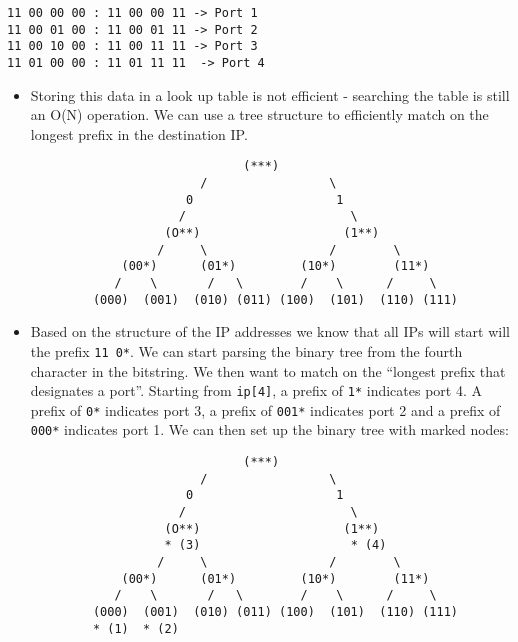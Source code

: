 \begin{itemize}
\begin{verbatim}
11 00 00 00 : 11 00 00 11 -> Port 1
11 00 01 00 : 11 00 01 11 -> Port 2
11 00 10 00 : 11 00 11 11 -> Port 3
11 01 00 00 : 11 01 11 11  -> Port 4
\end{verbatim}

  \begin{itemize}
  \tightlist
  \item
    Storing this data in a look up table is not efficient - searching
    the table is still an O(N) operation. We can use a tree structure to
    efficiently match on the longest prefix in the destination IP.
  \end{itemize}

\begin{verbatim}
                                 (***)
                           /                 \
                         0                    1
                        /                       \
                      (O**)                    (1**)
                     /     \                 /        \
                (00*)      (01*)         (10*)        (11*)
               /    \       /   \        /    \      /     \
            (000)  (001)  (010) (011) (100)  (101)  (110) (111)
\end{verbatim}

  \begin{itemize}
  \tightlist
  \item
    Based on the structure of the IP addresses we know that all IPs will
    start will the prefix \texttt{11\ 0*}. We can start parsing the
    binary tree from the fourth character in the bitstring. We then want
    to match on the ``longest prefix that designates a port''. Starting
    from \texttt{ip{[}4{]}}, a prefix of \texttt{1*} indicates port 4. A
    prefix of \texttt{0*} indicates port 3, a prefix of \texttt{001*}
    indicates port 2 and a prefix of \texttt{000*} indicates port 1. We
    can then set up the binary tree with marked nodes:
  \end{itemize}

\begin{verbatim}
                                 (***)
                           /                 \
                         0                    1
                        /                       \
                      (O**)                    (1**)
                      * (3)                     * (4)
                     /     \                 /        \
                (00*)      (01*)         (10*)        (11*)
               /    \       /   \        /    \      /     \
            (000)  (001)  (010) (011) (100)  (101)  (110) (111)
            * (1)  * (2)
\end{verbatim}


\end{itemize}
